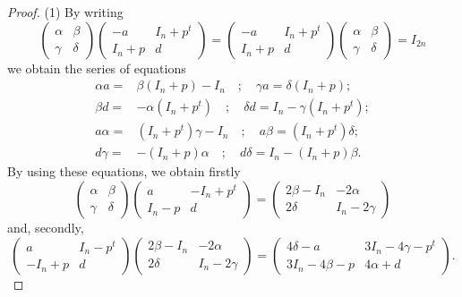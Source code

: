 \documentclass[10pt,a4paper]{amsart}
\begin{document}
\begin{proof} (1) By writing
\begin{equation*}\begin{pmatrix} \alpha &\beta \\
\gamma & \delta  \end{pmatrix} \begin{pmatrix} -a&I_n+p^t\\
I_n+p&d \end{pmatrix}=\begin{pmatrix} -a&I_n+p^t\\
I_n+p&d \end{pmatrix}\begin{pmatrix} \alpha &\beta \\
\gamma & \delta  \end{pmatrix} =I_{2n}
\end{equation*} 
we obtain the series of equations
\begin{align*}\alpha a=&\beta (I_n+p)-I_n\quad; \quad \gamma a=\delta (I_n+p);\\
\beta d=&-\alpha (I_n+p^t)\quad; \quad \delta d=I_n-\gamma (I_n+p^t);\\
a \alpha =&(I_n+p^t)\gamma -I_n\quad; \quad a\beta=(I_n+p^t)\delta;\\
d\gamma=&-(I_n+p)\alpha \quad; \quad d\delta=I_n-(I_n+p)\beta.
\end{align*}
By using these equations, we obtain firstly
\begin{equation*}\begin{pmatrix} \alpha &\beta \\
\gamma & \delta  \end{pmatrix} \begin{pmatrix} a&-I_n+p^t\\
I_n-p&d \end{pmatrix}=\begin{pmatrix} 2\beta-I_n &-2\alpha \\
2\delta & I_n-2\gamma  \end{pmatrix}\end{equation*}
and, secondly,
\begin{equation*}\begin{pmatrix} a&I_n-p^t\\
-I_n+p&d \end{pmatrix}\begin{pmatrix} 2\beta-I_n &-2\alpha \\
2\delta & I_n-2\gamma  \end{pmatrix}= 
\begin{pmatrix}4\delta -a&3I_n-4\gamma -p^t\\
3I_n-4\beta-p&4\alpha+d \end{pmatrix}.
\end{equation*}


\end{proof}
\end{document}
